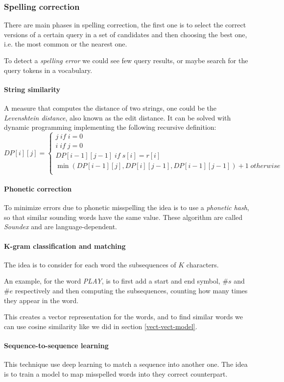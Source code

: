 \subsubsection{Spelling correction}
There are main phases in spelling correction, 
the first one is to select the correct versions of a certain 
query in a set of candidates and then choosing the best one, i.e. the
most common or the nearest one.

To detect a \emph{spelling error} we could see few query results, or maybe 
search for the query tokens in a vocabulary.

\paragraph{String similarity}
A measure that computes the distance of two strings, one could be the 
\emph{Levenshtein distance}, also known as the edit distance.
It can be solved with dynamic programming implementing the following recursive 
definition:
\[
    DP[i][j] = 
    \begin{cases}
        j \mathit{\;if\;} i = 0\\
        i \mathit{\;if\;} j = 0\\
        DP[i-1][j-1] \mathit{\;if\;} s[i] = r[i]\\
        \min(DP[i-1][j], DP[i][j-1], DP[i-1][j-1]) + 1 \mathit{\;otherwise\;}\\
    \end{cases}
\]

\paragraph{Phonetic correction}
To minimize errors due to phonetic misspelling the idea is to 
use a \emph{phonetic hash}, so that similar sounding words have the same value. 
These algorithm are called \emph{Soundex} and are language-dependent.

\paragraph{K-gram classification and matching}
The idea is to consider for each word the subsequences of $K$ characters.

An example, for the word \emph{PLAY}, is to first add a start and end symbol, 
$\#s$ and $\#e$ respectively and then computing the subsequences, counting how 
many times they appear in the word.

This creates a vector representation for the words, and to find similar words 
we can use cosine similarity like we did in section \vref{vect-vect-model}.

\paragraph{Sequence-to-sequence learning}
This technique use deep learning to match a sequence into another one.
The idea is to train a model to map misspelled words into they correct 
counterpart.